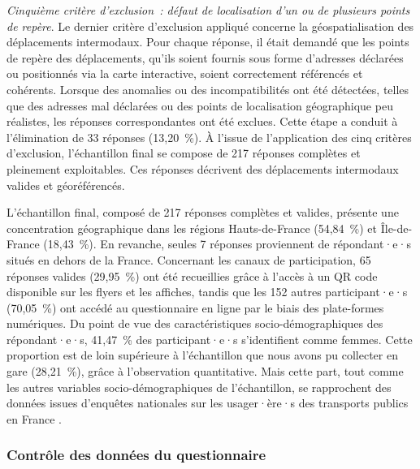 \begin{refsegment}
\textsl{Cinquième critère d'exclusion~: défaut de localisation d'un ou de plusieurs points de repère}. Le dernier critère d’exclusion appliqué concerne la géospatialisation des déplacements intermodaux. Pour chaque réponse, il était demandé que les points de repère des déplacements, qu’ils soient fournis sous forme d’adresses déclarées ou positionnés via la carte interactive, soient correctement référencés et cohérents. Lorsque des anomalies ou des incompatibilités ont été détectées, telles que des adresses mal déclarées ou des points de localisation géographique peu réalistes, les réponses correspondantes ont été exclues. Cette étape a conduit à l’élimination de 33 réponses (13,20~\%). À l’issue de l’application des cinq critères d’exclusion, l’échantillon final se compose de 217 réponses complètes et pleinement exploitables. Ces réponses décrivent des déplacements intermodaux valides et géoréférencés.%

L’échantillon final, composé de 217 réponses complètes et valides, présente une concentration géographique dans les régions Hauts-de-France (54,84~\%) et Île-de-France (18,43~\%). En revanche, seules 7 réponses proviennent de répondant·e·s situés en dehors de la France. Concernant les canaux de participation, 65 réponses valides (29,95~\%) ont été recueillies grâce à l'accès à un QR code disponible sur les flyers et les affiches, tandis que les 152 autres participant·e·s (70,05~\%) ont accédé au questionnaire en ligne par le biais des plate-formes numériques. Du point de vue des caractéristiques socio-démographiques des répondant·e·s, 41,47~\% des participant·e·s s’identifient comme femmes. Cette proportion est de loin supérieure à l'échantillon que nous avons pu collecter en gare (28,21~\%), grâce à l'observation quantitative. Mais cette part, tout comme les autres variables socio-démographiques de l'échantillon, se rapprochent des données issues d’enquêtes nationales sur les usager·ère·s des transports publics en France  \textcolor{blue}{\autocite[]{enov_enquete_2021}}.%

\subsubsection*{Contrôle des données du questionnaire
    \label{chap3:administration-questionnaire-usagers-validation}
    }


\end{refsegment}
